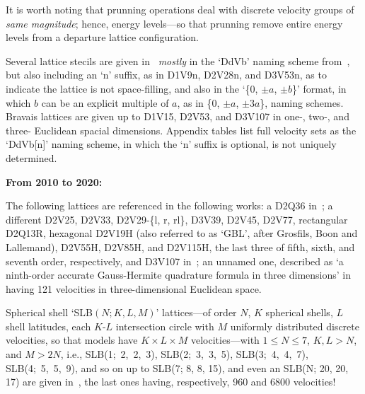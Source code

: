     It is worth noting that prunning operations deal with discrete velocity  groups  of  \emph{same  magnitude};  hence,  energy
    levels---so that prunning remove entire energy levels from a departure lattice configuration.

    Several lattice stecils are given in~\cite{2009-SurmasR+PhilippiPC-EurPhysJSpecialTopics} \emph{mostly} in the `DdVb' naming
    scheme from~\cite{2006-PhilippiPC+SurmasR-PhysRevE}, but also including an `n' suffix, as in D1V9n, D2V28n, and  D3V53n,  as
    to indicate the lattice is not space-filling, and also in the `\{$0$, $\pm a$, $\pm b$\}' format, in which  $b$  can  be  an
    explicit multiple of $a$, as in \{$0$, $\pm a$, $\pm 3a$\}, naming schemes. Bravais lattices are given up to  D1V15,  D2V53,
    and D3V107 in one-, two-, and three- Euclidean spacial dimensions. Appendix tables list full velocity sets as the  `DdVb[n]'
    naming scheme, in which the `n' suffix is optional, is not uniquely determined.


    \vspace{2.0mm}\noindent\textbf{From 2010 to 2020:}\vspace{1.0mm}

    The      following      lattices      are      referenced      in       the       following       works:       a       D2Q36
    in~\cite[p.~452]{2010-AidunCK+ClausenJR-AnnuRevFluidMech}; a different D2V25,  D2V33,  D2V29-\{l,  r,  rl\},  D3V39,  D2V45,
    D2V77, rectangular D2Q13R, hexagonal D2V19H (also referred to as `GBL', after Grosfils, Boon and Lallemand), D2V55H, D2V85H,
    and D2V115H, the last three of fifth, sixth, and seventh order, respectively, and D3V107 in~\cite{2010-HegeleLA-DrUFSC};  an
    unnamed  one,  described  as   `a   ninth-order   accurate   Gauss-Hermite   quadrature   formula   in   three   dimensions'
    in~\cite{2008-NieX+ChenH-PhysRevE} having 121 velocities in three-dimensional Euclidean space.

    Spherical shell `SLB$(N; K, L, M)$' lattices---of order $N$,  $K$  spherical  shells,  $L$  shell  latitudes,  each  $K$-$L$
    intersection circle with $M$ uniformly distributed  discrete  velocities,  so  that  models  have  $K  \times  L  \times  M$
    velocities---with $1 \leqslant N \leqslant  7$,  $K,  L  >  N$,  and  $M  >  2N$,  i.e.,  SLB(1;~2,~2,~3),  SLB(2;~3,~3,~5),
    SLB(3;~4,~4,~7), SLB(4;~5,~5,~9), and so  on  up  to  SLB(7;  8,  8,  15),  and  even  an  SLB(N;  20,  20,  17)  are  given
    in~\cite{2012-AmbrusVE+SofoneaV-PhysRevE}, the last ones having, respectively, 960 and 6800 velocities!

